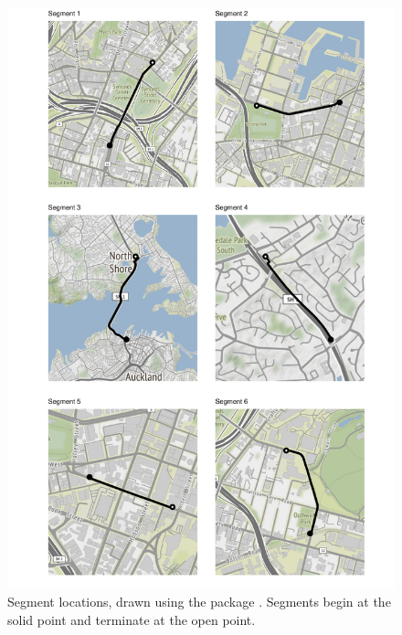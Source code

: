 \begin{knitrout}\small
{}\color{fgcolor}\begin{figure}

{\centering \includegraphics[width=\textwidth]{figure/nw_seg_maps-1} 

}

\caption[Segment locations, drawn using the  package \citep{ggmap}]{Segment locations, drawn using the  package \citep{ggmap}. Segments begin at the solid point and terminate at the open point.}\label{fig:nw_seg_maps}
\end{figure}


\end{knitrout}




